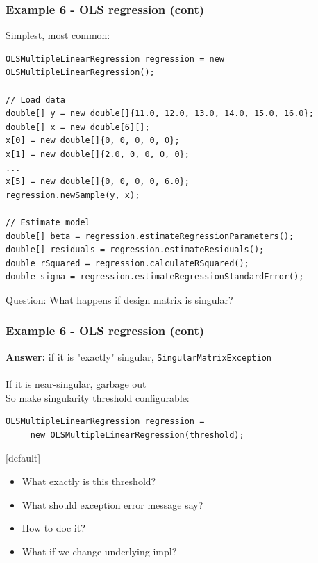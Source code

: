 \documentclass[14pt,mathserif]{beamer}
\begin{document}
\begin{frame}[fragile]
  \frametitle{Example 6 - OLS regression (cont)}

\begin{small}
Simplest, most common:
\begin{verbatim}
OLSMultipleLinearRegression regression = new OLSMultipleLinearRegression();

// Load data
double[] y = new double[]{11.0, 12.0, 13.0, 14.0, 15.0, 16.0};
double[] x = new double[6][];
x[0] = new double[]{0, 0, 0, 0, 0};
x[1] = new double[]{2.0, 0, 0, 0, 0};
...
x[5] = new double[]{0, 0, 0, 0, 6.0};          
regression.newSample(y, x);

// Estimate model
double[] beta = regression.estimateRegressionParameters();       
double[] residuals = regression.estimateResiduals();
double rSquared = regression.calculateRSquared();
double sigma = regression.estimateRegressionStandardError();
\end{verbatim}
Question:  What happens if design matrix is singular?
\end{small}
\end{frame}

\begin{frame}[fragile]
  \frametitle{Example 6 - OLS regression (cont)}

\begin{small}
\textbf{Answer:} if it is "exactly" singular, \texttt{SingularMatrixException}
\\~\\
If it is near-singular, garbage out \\
So make singularity threshold configurable:
\begin{verbatim}
OLSMultipleLinearRegression regression =
     new OLSMultipleLinearRegression(threshold);
\end{verbatim}
[default]
\begin{itemize}
\item What exactly is this threshold?
\item What should exception error message say?
\item How to doc it?
\item What if we change underlying impl?
\end{itemize}
\end{small}
\end{frame}
\end{document}
